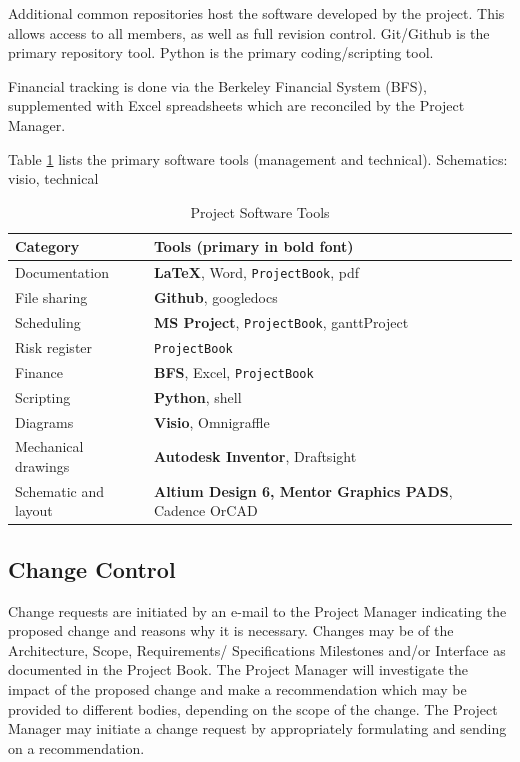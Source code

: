 \documentclass[preprint]{aastex}
\begin{document}
Additional common repositories host the software developed by the project.  This allows access to all members,
as well as full revision control.  Git/Github is the primary repository tool.  Python is the primary coding/scripting
tool.

Financial tracking is done via the Berkeley Financial System (BFS), supplemented with Excel spreadsheets which are
reconciled by the Project Manager.

Table \ref{tab:softwareTools} lists the primary software tools (management and technical).  Schematics:  visio, technical
\begin{table}[h]
\centering
\caption{Project Software Tools}
\label{tab:softwareTools}
\begin{tabular}{| p{1.3in} | p{4.7in} |}\hline
\textbf{Category} & \textbf{Tools} (primary in bold font) \\ \hline
\raggedright{Documentation} & \textbf{\LaTeX}, Word, {\tt ProjectBook}, pdf \\ \hline
\raggedright{File sharing} & \textbf{Github}, googledocs \\ \hline
\raggedright{Scheduling} & \textbf{MS Project}, {\tt ProjectBook}, ganttProject \\ \hline
\raggedright{Risk register} & {\tt ProjectBook}\\ \hline
\raggedright{Finance} & \textbf{BFS}, Excel, {\tt ProjectBook} \\ \hline
\raggedright{Scripting} & \textbf{Python}, shell \\ \hline
\raggedright{Diagrams} & \textbf{Visio}, Omnigraffle \\ \hline
\raggedright{Mechanical drawings} & \textbf{Autodesk Inventor}, Draftsight \\ \hline
\raggedright{Schematic and layout} &\textbf{Altium Design 6, Mentor Graphics PADS}, Cadence OrCAD \\ \hline
\end{tabular}
\end{table}

\subsection{Change Control}
\label{sec:changecontrol}
Change requests are initiated by an e-mail to the Project Manager indicating the proposed change
and reasons why it is necessary.  Changes may be of the Architecture, Scope, Requirements/ Specifications
Milestones and/or Interface as documented in the Project Book.  The Project Manager will investigate the 
impact of the proposed change and make a recommendation which may be provided to different bodies, 
depending on the scope of the change.  The Project Manager may initiate a change request by appropriately 
formulating and sending on a recommendation.
\end{document}
